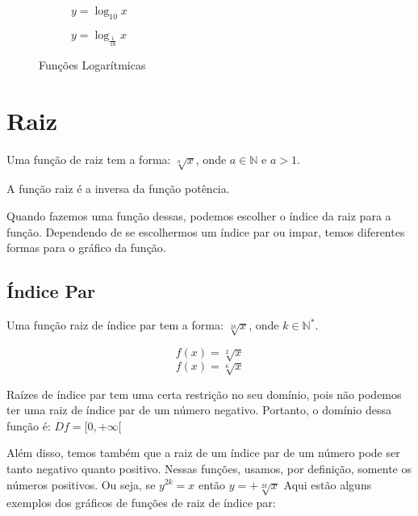 \begin{figure}[H]
\centering
	\begin{subfigure}[b]{0.4\linewidth}
	\centering
	\caption{$y=\log_{10} x$}
	\end{subfigure}
	\qquad
	\begin{subfigure}[b]{0.4\textwidth}
	\centering
	\caption{$y=\log_\frac{1}{10}x$}
	\end{subfigure}
\caption{Funções Logarítmicas}
\end{figure}

\section{Raiz} %
Uma função de raiz tem a forma: $\sqrt[a]{x}$, onde $a \in \mathbb{N}$ e $a>1$. \par 
A função raiz é a inversa da função potência.\par 
Quando fazemos uma função dessas, podemos escolher o índice da raiz para a função. Dependendo de se escolhermos um índice par ou impar, temos diferentes formas para o gráfico da função.
\subsection{Índice Par}
Uma função raiz de índice par tem a forma: $\sqrt[2k]{x}$, onde $k \in \mathbb{N}^*$. 
\begin{exemplo}
\[f(x)=\sqrt[2]{x}\]
\[f(x)=\sqrt[6]{x}\]
\end{exemplo}
Raízes de índice par tem uma certa restrição no seu domínio, pois não podemos ter uma raiz de índice par de um número negativo. Portanto, o domínio dessa função é: $Df = [0,+\infty[$\par 
Além disso, temos também que a raiz de um índice par de um número pode ser tanto negativo quanto positivo. Nessas funções, usamos, por definição, somente os números positivos. Ou seja, se $y^{2k}=x$ então $y= + \sqrt[2k]{x}$
Aqui estão alguns exemplos dos gráficos de funções de raiz de índice par: 

